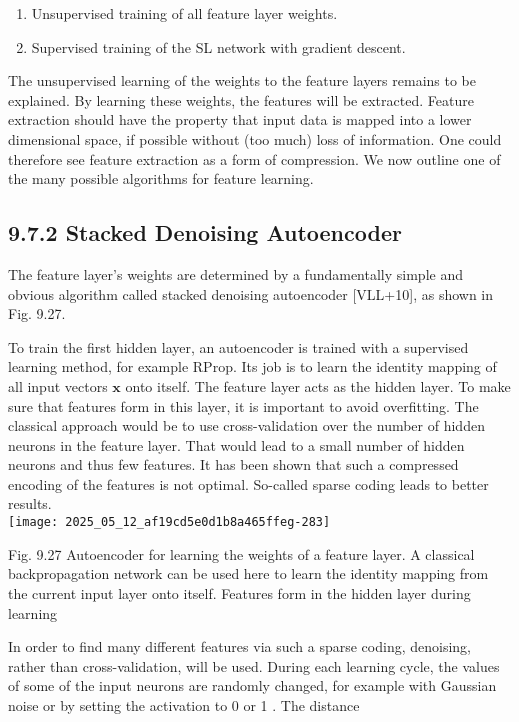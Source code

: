 \documentclass[10pt]{article}
\begin{document}
\begin{enumerate}
  \item Unsupervised training of all feature layer weights.
  \item Supervised training of the SL network with gradient descent.
\end{enumerate}

The unsupervised learning of the weights to the feature layers remains to be explained. By learning these weights, the features will be extracted. Feature extraction should have the property that input data is mapped into a lower dimensional space, if possible without (too much) loss of information. One could therefore see feature extraction as a form of compression. We now outline one of the many possible algorithms for feature learning.

\subsection*{9.7.2 Stacked Denoising Autoencoder}
The feature layer's weights are determined by a fundamentally simple and obvious algorithm called stacked denoising autoencoder [VLL+10], as shown in Fig. 9.27.

To train the first hidden layer, an autoencoder is trained with a supervised learning method, for example RProp. Its job is to learn the identity mapping of all input vectors $\boldsymbol{x}$ onto itself. The feature layer acts as the hidden layer. To make sure that features form in this layer, it is important to avoid overfitting. The classical approach would be to use cross-validation over the number of hidden neurons in the feature layer. That would lead to a small number of hidden neurons and thus few features. It has been shown that such a compressed encoding of the features is not optimal. So-called sparse coding leads to better results.\\
\texttt{[image: 2025\_05\_12\_af19cd5e0d1b8a465ffeg-283]}

Fig. 9.27 Autoencoder for learning the weights of a feature layer. A classical backpropagation network can be used here to learn the identity mapping from the current input layer onto itself. Features form in the hidden layer during learning

In order to find many different features via such a sparse coding, denoising, rather than cross-validation, will be used. During each learning cycle, the values of some of the input neurons are randomly changed, for example with Gaussian noise or by setting the activation to 0 or 1 . The distance
\end{document}
